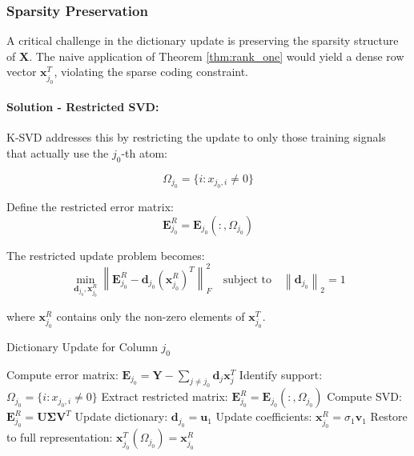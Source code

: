 \documentclass[12pt]{article}
\renewcommand{\vec}[1]{\mathbf{#1}}
\newcommand{\norm}[1]{\left\|#1\right\|}
\theoremstyle{definition}
\begin{document}
\subsubsection{Sparsity Preservation}

A critical challenge in the dictionary update is preserving the sparsity structure of $\mathbf{X}$. The naive application of Theorem \ref{thm:rank_one} would yield a dense row vector $\vec{x}_{j_0}^T$, violating the sparse coding constraint.

\paragraph{Solution - Restricted SVD:} K-SVD addresses this by restricting the update to only those training signals that actually use the $j_0$-th atom:

\begin{equation}\label{eq:support_set}
    \Omega_{j_0} = \{i : x_{j_0,i} \neq 0\}
\end{equation}

Define the restricted error matrix:
\begin{equation}\label{eq:restricted_error}
    \mathbf{E}_{j_0}^R = \mathbf{E}_{j_0}(:, \Omega_{j_0})
\end{equation}

The restricted update problem becomes:
\begin{equation}\label{eq:restricted_update}
    \min_{\vec{d}_{j_0}, \vec{x}_{j_0}^R} \norm{\mathbf{E}_{j_0}^R - \vec{d}_{j_0} (\vec{x}_{j_0}^R)^T}_F^2 \quad \text{subject to} \quad \norm{\vec{d}_{j_0}}_2 = 1
\end{equation}

where $\vec{x}_{j_0}^R$ contains only the non-zero elements of $\vec{x}_{j_0}^T$.

\begin{algorithm}[H]
    \caption{Dictionary Update for Column $j_0$}
    \begin{algorithmic}[1]
        \STATE Compute error matrix: $\mathbf{E}_{j_0} = \mathbf{Y} - \sum_{j \neq j_0} \vec{d}_j \vec{x}_j^T$
        \STATE Identify support: $\Omega_{j_0} = \{i : x_{j_0,i} \neq 0\}$
        \STATE Extract restricted matrix: $\mathbf{E}_{j_0}^R = \mathbf{E}_{j_0}(:, \Omega_{j_0})$
        \STATE Compute SVD: $\mathbf{E}_{j_0}^R = \mathbf{U}\mathbf{\Sigma}\mathbf{V}^T$
        \STATE Update dictionary: $\vec{d}_{j_0} = \vec{u}_1$
        \STATE Update coefficients: $\vec{x}_{j_0}^R = \sigma_1 \vec{v}_1$
        \STATE Restore to full representation: $\vec{x}_{j_0}^T(\Omega_{j_0}) = \vec{x}_{j_0}^R$
    \end{algorithmic}
\end{algorithm}
\end{document}
